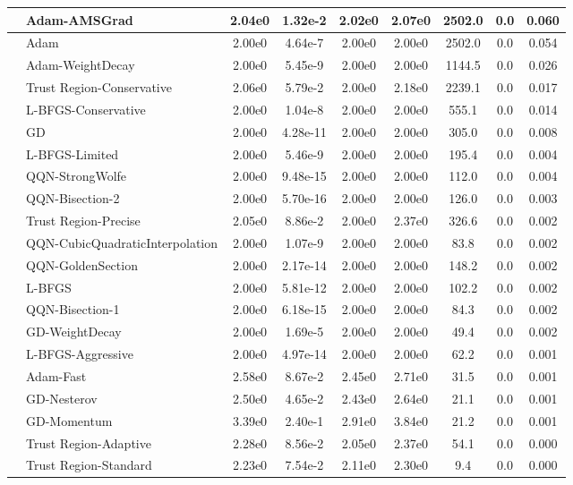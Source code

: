\documentclass[10pt]{article}
\begin{document}
\begin{longtable}{|l|l|c|c|c|c|c|c|c|}
\hline
 & Adam-AMSGrad & 2.04e0 & 1.32e-2 & 2.02e0 & 2.07e0 & 2502.0 & 0.0 & 0.060 \\
\hline
 & Adam & 2.00e0 & 4.64e-7 & 2.00e0 & 2.00e0 & 2502.0 & 0.0 & 0.054 \\
\hline
 & Adam-WeightDecay & 2.00e0 & 5.45e-9 & 2.00e0 & 2.00e0 & 1144.5 & 0.0 & 0.026 \\
\hline
 & Trust Region-Conservative & 2.06e0 & 5.79e-2 & 2.00e0 & 2.18e0 & 2239.1 & 0.0 & 0.017 \\
\hline
 & L-BFGS-Conservative & 2.00e0 & 1.04e-8 & 2.00e0 & 2.00e0 & 555.1 & 0.0 & 0.014 \\
\hline
 & GD & 2.00e0 & 4.28e-11 & 2.00e0 & 2.00e0 & 305.0 & 0.0 & 0.008 \\
\hline
 & L-BFGS-Limited & 2.00e0 & 5.46e-9 & 2.00e0 & 2.00e0 & 195.4 & 0.0 & 0.004 \\
\hline
 & QQN-StrongWolfe & 2.00e0 & 9.48e-15 & 2.00e0 & 2.00e0 & 112.0 & 0.0 & 0.004 \\
\hline
 & QQN-Bisection-2 & 2.00e0 & 5.70e-16 & 2.00e0 & 2.00e0 & 126.0 & 0.0 & 0.003 \\
\hline
 & Trust Region-Precise & 2.05e0 & 8.86e-2 & 2.00e0 & 2.37e0 & 326.6 & 0.0 & 0.002 \\
\hline
 & QQN-CubicQuadraticInterpolation & 2.00e0 & 1.07e-9 & 2.00e0 & 2.00e0 & 83.8 & 0.0 & 0.002 \\
\hline
 & QQN-GoldenSection & 2.00e0 & 2.17e-14 & 2.00e0 & 2.00e0 & 148.2 & 0.0 & 0.002 \\
\hline
 & L-BFGS & 2.00e0 & 5.81e-12 & 2.00e0 & 2.00e0 & 102.2 & 0.0 & 0.002 \\
\hline
 & QQN-Bisection-1 & 2.00e0 & 6.18e-15 & 2.00e0 & 2.00e0 & 84.3 & 0.0 & 0.002 \\
\hline
 & GD-WeightDecay & 2.00e0 & 1.69e-5 & 2.00e0 & 2.00e0 & 49.4 & 0.0 & 0.002 \\
\hline
 & L-BFGS-Aggressive & 2.00e0 & 4.97e-14 & 2.00e0 & 2.00e0 & 62.2 & 0.0 & 0.001 \\
\hline
 & Adam-Fast & 2.58e0 & 8.67e-2 & 2.45e0 & 2.71e0 & 31.5 & 0.0 & 0.001 \\
\hline
 & GD-Nesterov & 2.50e0 & 4.65e-2 & 2.43e0 & 2.64e0 & 21.1 & 0.0 & 0.001 \\
\hline
 & GD-Momentum & 3.39e0 & 2.40e-1 & 2.91e0 & 3.84e0 & 21.2 & 0.0 & 0.001 \\
\hline
 & Trust Region-Adaptive & 2.28e0 & 8.56e-2 & 2.05e0 & 2.37e0 & 54.1 & 0.0 & 0.000 \\
\hline
 & Trust Region-Standard & 2.23e0 & 7.54e-2 & 2.11e0 & 2.30e0 & 9.4 & 0.0 & 0.000 \\

\end{longtable}
\end{document}
